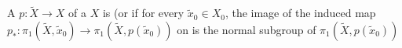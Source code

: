 \begin{definition} \label{definition:normal_covering_space_of_a_topological_space}
A  $p: \tilde{X} \to X$ of a  $X$ is  (or  if for every $\tilde{x}_0 \in X_0$, the image of the induced map $p_*: \pi_1(\tilde{X},\tilde{x}_0) \to \pi_1(\tilde{X},p(\tilde{x}_0))$ on  is the normal subgroup of $\pi_1(\tilde{X},p(\tilde{x}_0))$ 

\end{definition}
